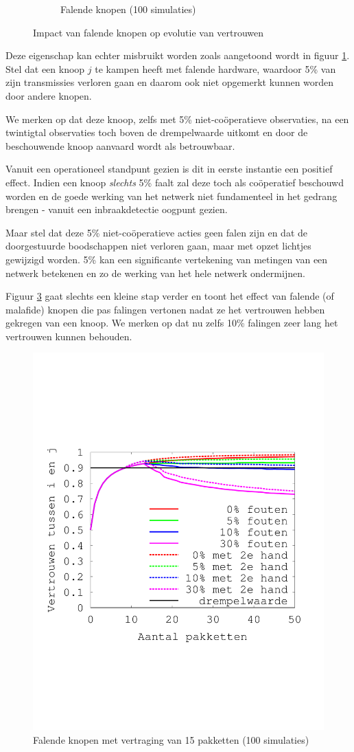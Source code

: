 \begin{figure}[ht]
\begin{subfigure}{.49\textwidth}
  \caption{Falende knopen (100 simulaties)}
  \label{fig:reputation-with-failure}
\end{subfigure}
\caption{Impact van falende knopen op evolutie van vertrouwen}
\label{fig:reputation-paper-with-failure}
\end{figure}

Deze eigenschap kan echter misbruikt worden zoals aangetoond wordt in figuur
\ref{fig:reputation-with-failure}. Stel dat een knoop $j$ te kampen heeft met
falende hardware, waardoor 5\% van zijn transmissies verloren gaan en daarom
ook niet opgemerkt kunnen worden door andere knopen.

We merken op dat deze knoop, zelfs met 5\% niet-co\"operatieve observaties, na
een twintigtal observaties toch boven de drempelwaarde uitkomt en door de
beschouwende knoop aanvaard wordt als betrouwbaar.

Vanuit een operationeel standpunt gezien is dit in eerste instantie een
positief effect. Indien een knoop \emph{slechts} 5\% faalt zal deze toch als
co\"operatief beschouwd worden en de goede werking van het netwerk niet
fundamenteel in het gedrang brengen - vanuit een inbraakdetectie oogpunt gezien.

Maar stel dat deze 5\% niet-co\"operatieve acties geen falen zijn en dat de
doorgestuurde boodschappen niet verloren gaan, maar met opzet lichtjes
gewijzigd worden. 5\% kan een significante vertekening van metingen van een
netwerk betekenen en zo de werking van het hele netwerk ondermijnen.

Figuur \ref{fig:reputation-malicious} gaat slechts een kleine stap verder en
toont het effect van falende (of malafide) knopen die pas falingen vertonen
nadat ze het vertrouwen hebben gekregen van een knoop. We merken op dat nu zelfs
10\% falingen zeer lang het vertrouwen kunnen behouden.

\begin{figure}[ht]
 \centering
 \includegraphics[width=.5\linewidth]{./resources/reputation-malicious.pdf}
 \caption{Falende knopen met vertraging van 15 pakketten (100 simulaties)}
 \label{fig:reputation-malicious}
\end{figure}

